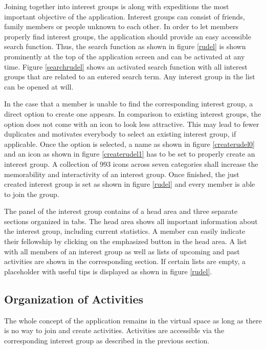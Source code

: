 \documentclass[12pt,numbers=noenddot,parskip,bibliography=totocnumbered,listof=totocnumbered,draft]{scrreprt}
\begin{document}
Joining together into interest groups is along with expeditions the most important objective of the application. Interest groups can consist of friends, family members or people unknown to each other. In order to let members properly find interest groups, the application should provide an easy accessible search function. Thus, the search function as shown in figure \ref{rudel} is shown prominently at the top of the application screen and can be activated at any time. Figure \ref{searchrudel} shows an activated search function with all interest groups that are related to an entered search term. Any interest group in the list can be opened at will. 

In the case that a member is unable to find the corresponding interest group, a direct option to create one appears. In comparison to existing interest groups, the option does not come with an icon to look less attractive. This may lead to fewer duplicates and motivates everybody to select an existing interest group, if applicable. Once the option is selected, a name as shown in figure \ref{createrudel0} and an icon as shown in figure \ref{createrudel1} has to be set to properly create an interest group. A collection of 993 icons across seven categories shall increase the memorability and interactivity of an interest group. Once finished, the just created interest group is set as shown in figure \ref{rudel} and every member is able to join the group.

The panel of the interest group contains of a head area and three separate sections organized in tabs. The head area shows all important information about the interest group, including current statistics. A member can easily indicate their fellowship by clicking on the emphasized button in the head area. A list with all members of an interest group as well as lists of upcoming and past activities are shown in the corresponding section. If certain lists are empty, a placeholder with useful tips is displayed as shown in figure \ref{rudel}. 

\subsection{Organization of Activities}
The whole concept of the application remains in the virtual space as long as there is no way to join and create activities. Activities are accessible via the corresponding interest group as described in the previous section. 
\end{document}
